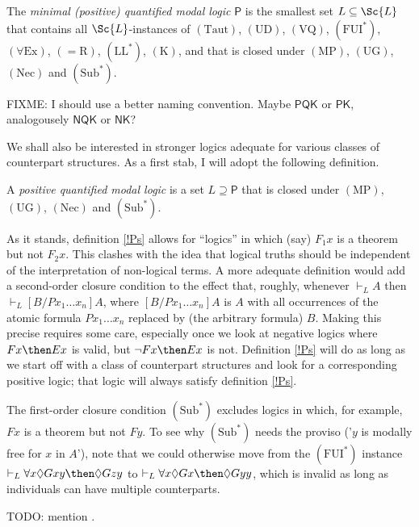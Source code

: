 \documentclass[11pt]{woarticle}
\theoremstyle{break}
\theoremstyle{nonumberplain}
\newcommand{\s}[1]{\ensuremath{\mathsf{#1}}}
\newcommand{\1}{\;\,|\;\,}
\newcommand{\T}[1]{\ensuremath{(\mathrm{ #1})}}
\begin{document}
\begin{definition}\label{!P}
  The \emph{minimal (positive) quantified modal logic} \s{P} is the
  smallest set $L \subseteq \Sc{L}$ that contains all $\Sc{L}$-instances of
  \T{Taut}, \T{UD}, \T{VQ}, \T{FUI^*}, \T{\forall Ex}, \T{=\!R}, \T{LL^*},
  \T{K}, and that is closed under \T{MP}, \T{UG}, \T{Nec} and \T{Sub^*}.
\end{definition}

FIXME: I should use a better naming convention. Maybe \s{PQK} or \s{PK},
analogousely \s{NQK} or \s{NK}?

We shall also be interested in stronger logics adequate for various classes of
counterpart structures. As a first stab, I will adopt the following definition.

\begin{definition}\label{!Ps}
  A \emph{positive quantified modal logic} is a set $L \supseteq \s{P}$ that
  is closed under \T{MP}, \T{UG}, \T{Nec} and \T{Sub^*}.
\end{definition}

As it stands, definition \ref{!Ps} allows for ``logics'' in which (say) $F_1x$
is a theorem but not $F_2x$. This clashes with the idea that logical truths
should be independent of the interpretation of non-logical terms. A more
adequate definition would add a second-order closure condition to the effect
that, roughly, whenever $\vdash_L A$ then $\vdash_L [B/Px_1\ldots x_n]A$, where
$[B/Px_1\ldots x_n]A$ is $A$ with all occurrences of the atomic formula
$Px_1\ldots x_n$ replaced by (the arbitrary formula) $B$.
Making this precise requires some care, especially once we look at negative
logics where $Fx \then Ex$ is valid, but $\neg Fx \then Ex$ is not. Definition
\ref{!Ps} will do as long as we start off with a class of counterpart
structures and look for a corresponding positive logic; that logic will always
satisfy definition \ref{!Ps}.

The first-order closure condition \T{Sub^*} excludes logics in which, for
example, $Fx$ is a theorem but not $Fy$. To see why \T{Sub^*} needs the proviso
('$y$ is modally free for $x$ in $A$'), note that we could otherwise move from
the \T{FUI^*} instance $\vdash_{L} \forall x \Diamond Gxy \then \Diamond Gzy$ to
$\vdash_{L} \forall x \Diamond Gx \then \Diamond Gyy$, which is invalid as long
as individuals can have multiple counterparts.

TODO: mention \cite{bauer2002consequence}.
\end{document}
